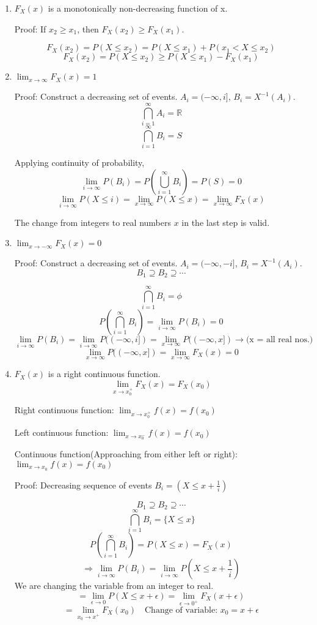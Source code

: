 \documentclass{article}
\begin{document}
\begin{enumerate}
    \item $F_X(x)$ is a monotonically non-decreasing function of x.

    Proof: If $x_2 \geq x_1$, then $F_X(x_2) \geq F_X(x_1)$.

    $$F_X(x_2) = P(X \leq x_2)= P(X \leq x_1)+P(x_1 < X \leq x_2)$$
    $$F_X(x_2) = P(X \leq x_2) \geq P(X \leq x_1) -F_X(x_1) $$

    \item $\lim_{x \to \infty} F_X(x)= 1$

    Proof: Construct a decreasing set of events. $A_i= (-\infty, i]$, $B_i = X^{-1}(A_i)$.
    $$ \bigcap_{i=1}^{\infty}A_i= \mathbb{R}$$
    $$ \bigcap_{i=1}^{\infty}B_i= S $$

    Applying continuity of probability,
    $$ \lim_{i \to \infty}P(B_i)= P(\bigcup_{i=1}^{\infty}B_i) =P(S) = 0$$
    $$ \lim_{i \to \infty}P(X \leq i)= \lim_{x \to \infty}P(X \leq x) = \lim_{x \to \infty} F_X(x)$$

    The change from integers to real numbers $x$ in the last step is valid.

    \item $\lim_{x \to -\infty} F_X(x)= 0$

    Proof: Construct a decreasing set of events. $A_i= (-\infty, -i]$, $B_i = X^{-1}(A_i)$.
    $$ B_1 \supseteq B_2 \supseteq \cdots$$

    $$ \bigcap_{i=1}^{\infty}B_i= \phi $$
    $$ P(\bigcap_{i=1}^{\infty}B_i) = \lim_{i \to \infty}P(B_i)= 0$$
    $$  \lim_{i \to \infty}P(B_i) =  \lim_{i \to \infty}P((-\infty,i])= \lim_{x \to \infty}P((-\infty,x]) \rightarrow \text{(x = all real nos.)}$$
    $$ \lim_{x \to \infty}P((-\infty,x]) = \lim_{x \to \infty}F_X(x)= 0$$
    \item $F_X(x)$ is a right continuous function.
    $$ \lim_{x \to x_0^+} F_X(x)= F_X(x_0)$$

    Right continuous function: $\lim_{x \to x_0^+} f(x)= f(x_0)$

    Left continuous function: $\lim_{x \to x_0^-} f(x)= f(x_0)$

    Continuous function(Approaching from either left or right): $\lim_{x \to x_0} f(x)= f(x_0)$

    Proof: Decreasing sequence of events $B_i= (X \leq x+\frac{1}{i})$

    $$ B_1 \supseteq B_2 \supseteq \cdots$$
    $$ \bigcap_{i=1}^{\infty}B_i= \{ X \leq x\}$$
    $$ P(\bigcap_{i=1}^{\infty}B_i) = P(X \leq x) = F_X(x)$$
    $$ \Rightarrow \lim_{i \to \infty}P(B_i)= \lim_{i \to \infty}P(X \leq x + \frac{1}{i})$$
    We are changing the variable from an integer to real.
    $$= \lim_{\epsilon \to 0}P(X \leq x + \epsilon)=\lim_{\epsilon \to 0^+}F_X(x + \epsilon) $$
    $$ = \lim_{x_0 \to x^+}F_X(x_0) \quad \text{Change of variable: }x_0= x+ \epsilon $$

\end{enumerate}
\end{document}
